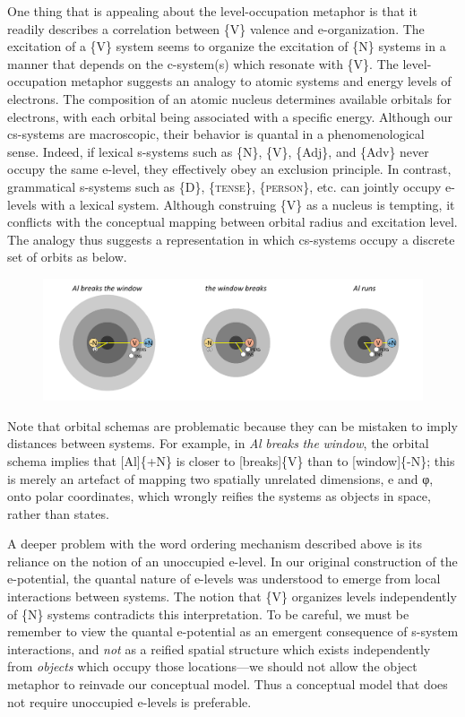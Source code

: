   One thing that is appealing about the level-occupation metaphor is that it readily describes a correlation between \{V\} valence and e-organization. The excitation of a \{V\} system seems to organize the excitation of \{N\} systems in a manner that depends on the c-system(s) which resonate with \{V\}. The level-occupation metaphor suggests an analogy to atomic systems and energy levels of electrons. The composition of an atomic nucleus determines available orbitals for electrons, with each orbital being associated with a specific energy. Although our cs-systems are macroscopic, their behavior is quantal in a phenomenological sense. Indeed, if lexical s-systems such as \{N\}, \{V\}, \{Adj\}, and \{Adv\} never occupy the same e-level, they effectively obey an exclusion principle. In contrast, grammatical s-systems such as \{D\}, \{\textsc{tense}\}, \{\textsc{person}\}, etc. can jointly occupy e-levels with a lexical system. Although construing \{V\} as a nucleus is tempting, it conflicts with the conceptual mapping between orbital radius and excitation level. The analogy thus suggests a representation in which cs-systems occupy a discrete set of orbits as below.

  
\begin{figure}
\includegraphics[width=\textwidth]{figures/Tilsen-img76.png}
\caption{\missingcaption}
\label{fig:}
\end{figure}
 

  Note that orbital schemas are problematic because they can be mistaken to imply distances between systems. For example, in \textit{Al} \textit{breaks} \textit{the} \textit{window}, the orbital schema implies that [Al]\{+N\} is closer to [breaks]\{V\} than to [window]\{-N\}; this is merely an artefact of mapping two spatially unrelated dimensions, e and φ, onto polar coordinates, which wrongly reifies the systems as objects in space, rather than states.

  A deeper problem with the word ordering mechanism described above is its reliance on the notion of an unoccupied e-level. In our original construction of the e-potential, the quantal nature of e-levels was understood to emerge from local interactions between systems. The notion that \{V\} organizes levels independently of \{N\} systems contradicts this interpretation. To be careful, we must be remember to view the quantal e-potential as an emergent consequence of s-system interactions, and \textit{not} as a reified spatial structure which exists independently from \textit{objects} which occupy those locations—we should not allow the object metaphor to reinvade our conceptual model. Thus a conceptual model that does not require unoccupied e-levels is preferable.

